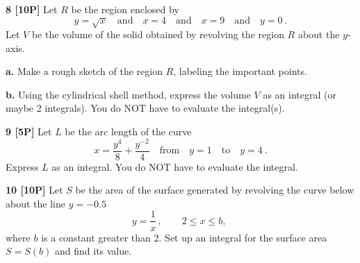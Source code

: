 \documentclass[12pt]{article}
\begin{document}

{\bf 8 [10P]} Let $R$ be the region enclosed by 
\begin{equation*} 
y = \sqrt{x}
\quad\textrm{and}\quad 
 x =4
\quad\textrm{and}\quad 
 x = 9
\quad\textrm{and}\quad
 y = 0 ~. 
\end{equation*} 
 Let $V$ be the volume of the solid obtained by 
revolving the region $R$ about the $y$-axis.  

{\bf a.}  Make a rough sketch of the region $R$, 
labeling the important points.  

{\bf b.}    Using the cylindrical shell  method, 
express the volume $V$ as an integral 
(or maybe 2 integrals).  
\newline 
You do NOT have to evaluate the integral(s). 

{\bf 9 [5P]} Let $L$ be the arc length of the curve 
\begin{equation*} 
x = \frac{y^4}{8} + \frac{y^{-2}}{4} 
\quad\textrm{from}\quad
y=1 
\quad\textrm{to}\quad
y=4 ~. 
\end{equation*} 
Express $L$ as an integral.  
You do NOT have to evaluate the integral.

{\bf 10 [10P]} Let $S$ be the area of the surface generated by 
revolving the curve below about the line $y=-0.5$
\begin{equation*} 
y = \frac{1}{x}\,,\quad \quad 2\le x
\le b, \;%
\end{equation*} 
where $b$ is a constant greater than 2.  Set up an integral for the surface area $S=S(b)$ 
and find its value.







 
\end{document}
